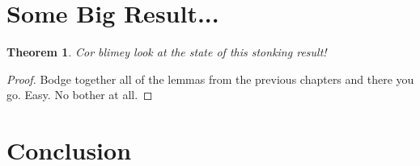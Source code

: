 \documentclass[11pt, oneside]{article}
\theoremstyle{plain}
\newtheorem{theorem}{Theorem}[section]
\theoremstyle{definition}
\begin{document}
\newpage
\section{Some Big Result...}
\begin{theorem}
    Cor blimey look at the state of this stonking result!
\end{theorem}

\begin{proof}
    Bodge together all of the lemmas from the previous chapters and there you go.
    Easy.
    No bother at all.
\end{proof}

\newpage
\section{Conclusion}

\newpage


\end{document}
